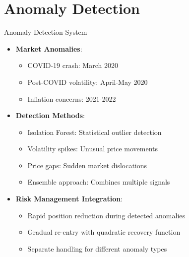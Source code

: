 \documentclass[aspectratio=169,xcolor=dvipsnames]{beamer}
\begin{document}
\section{Anomaly Detection}
\begin{frame}{Anomaly Detection System}
    \begin{itemize}
        \item \textbf{Market Anomalies}:
              \begin{itemize}
                  \item COVID-19 crash: March 2020
                  \item Post-COVID volatility: April-May 2020
                  \item Inflation concerns: 2021-2022
              \end{itemize}
        \item \textbf{Detection Methods}:
              \begin{itemize}
                  \item Isolation Forest: Statistical outlier detection
                  \item Volatility spikes: Unusual price movements
                  \item Price gaps: Sudden market dislocations
                  \item Ensemble approach: Combines multiple signals
              \end{itemize}
        \item \textbf{Risk Management Integration}:
              \begin{itemize}
                  \item Rapid position reduction during detected anomalies
                  \item Gradual re-entry with quadratic recovery function
                  \item Separate handling for different anomaly types
              \end{itemize}
    \end{itemize}
\end{frame}
\end{document}
